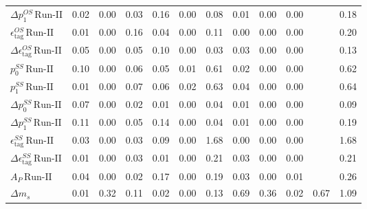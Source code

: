 \begin{tabular}{l  c  c  c  c  c  c  c  c  c  c  | c }
$\Delta p_{1}^{OS} \, \text{Run-II}$ & 0.02 & 0.00 & 0.03 & 0.16 & 0.00 & 0.08 & 0.01 & 0.00 & 0.00 &  & 0.18 \\ 
$\epsilon_{\text{tag}}^{OS} \, \text{Run-II}$ & 0.01 & 0.00 & 0.16 & 0.04 & 0.00 & 0.11 & 0.00 & 0.00 & 0.00 &  & 0.20 \\ 
$\Delta \epsilon_{\text{tag}}^{OS} \, \text{Run-II}$ & 0.05 & 0.00 & 0.05 & 0.10 & 0.00 & 0.03 & 0.03 & 0.00 & 0.00 &  & 0.13 \\ 
$p_{0}^{SS} \, \text{Run-II}$ & 0.10 & 0.00 & 0.06 & 0.05 & 0.01 & 0.61 & 0.02 & 0.00 & 0.00 &  & 0.62 \\ 
$p_{1}^{SS} \, \text{Run-II}$ & 0.01 & 0.00 & 0.07 & 0.06 & 0.02 & 0.63 & 0.04 & 0.00 & 0.00 &  & 0.64 \\ 
$\Delta p_{0}^{SS} \, \text{Run-II}$ & 0.07 & 0.00 & 0.02 & 0.01 & 0.00 & 0.04 & 0.01 & 0.00 & 0.00 &  & 0.09 \\ 
$\Delta p_{1}^{SS} \, \text{Run-II}$ & 0.11 & 0.00 & 0.05 & 0.14 & 0.00 & 0.04 & 0.01 & 0.00 & 0.00 &  & 0.19 \\ 
$\epsilon_{\text{tag}}^{SS} \, \text{Run-II}$ & 0.03 & 0.00 & 0.03 & 0.09 & 0.00 & 1.68 & 0.00 & 0.00 & 0.00 &  & 1.68 \\ 
$\Delta \epsilon_{\text{tag}}^{SS} \, \text{Run-II}$ & 0.01 & 0.00 & 0.03 & 0.01 & 0.00 & 0.21 & 0.03 & 0.00 & 0.00 &  & 0.21 \\ 
$A_{P} \, \text{Run-II}$ & 0.04 & 0.00 & 0.02 & 0.17 & 0.00 & 0.19 & 0.03 & 0.00 & 0.01 &  & 0.26 \\ 
$\Delta m_{s}$ & 0.01 & 0.32 & 0.11 & 0.02 & 0.00 & 0.13 & 0.69 & 0.36 & 0.02 & 0.67 & 1.09 \\ 
\hline
\hline
\end{tabular}
